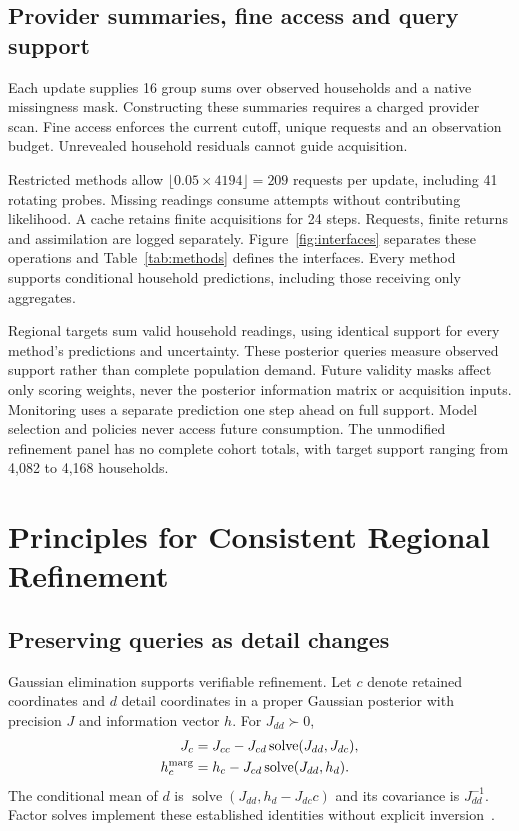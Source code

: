 \documentclass[conference]{IEEEtran}
\begin{document}
\subsection{Provider summaries, fine access and query support}
Each update supplies 16 group sums over observed households and a native missingness mask. Constructing these summaries requires a charged provider scan. Fine access enforces the current cutoff, unique requests and an observation budget. Unrevealed household residuals cannot guide acquisition.

Restricted methods allow $\lfloor0.05\times4194\rfloor=209$ requests per update, including 41 rotating probes. Missing readings consume attempts without contributing likelihood. A cache retains finite acquisitions for 24 steps. Requests, finite returns and assimilation are logged separately. Figure~\ref{fig:interfaces} separates these operations and Table~\ref{tab:methods} defines the interfaces. Every method supports conditional household predictions, including those receiving only aggregates.



Regional targets sum valid household readings, using identical support for every method's predictions and uncertainty. These posterior queries measure observed support rather than complete population demand. Future validity masks affect only scoring weights, never the posterior information matrix or acquisition inputs. Monitoring uses a separate prediction one step ahead on full support. Model selection and policies never access future consumption. The unmodified refinement panel has no complete cohort totals, with target support ranging from 4,082 to 4,168 households.








\section{Principles for Consistent Regional Refinement}
\subsection{Preserving queries as detail changes}
Gaussian elimination supports verifiable refinement. Let $c$ denote retained coordinates and $d$ detail coordinates in a proper Gaussian posterior with precision $J$ and information vector $h$. For $J_{dd}\succ0$,
\begin{align}
J_c&=J_{cc}-J_{cd}\operatorname{solve}(J_{dd},J_{dc}),\label{eq:schur}\\
h_c^{\rm marg}&=h_c-J_{cd}\operatorname{solve}(J_{dd},h_d).
\end{align}
The conditional mean of $d$ is $\operatorname{solve}(J_{dd},h_d-J_{dc}c)$ and its covariance is $J_{dd}^{-1}$. Factor solves implement these established identities without explicit inversion~\cite{distributed,isam}.
\end{document}
